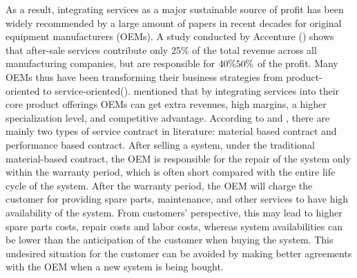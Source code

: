 \documentclass[preprint,12pt]{elsarticle}
\begin{document}

As a result, integrating services as a major sustainable source of profit has been widely recommended by a large amount of papers in recent decades for original equipment manufacturers (OEMs). A study conducted by Accenture (\citet{Dennis}) shows that after-sale services contribute only 25\% of the total revenue across all manufacturing companies, but are responsible for $40\%\-50\%$ of the profit. Many OEMs thus have been transforming their business strategies from product-oriented to service-oriented(\citet{Cohen2006}). \citet{Oliva} mentioned that by integrating services into their core product offerings OEMs can get extra revenues, high margins, a higher specialization level, and competitive advantage. According to \citet{Kim2007} and \citet{Oliva}, there are mainly two types of service contract in literature: material based contract and performance based contract. After selling a system, under the traditional material-based contract, the OEM is responsible for the repair of the system only within the warranty period, which is often short compared with the entire life cycle of the system. After the warranty period, the OEM will charge the customer for providing spare parts, maintenance, and other services to have high availability of the system. From customers' perspective, this may lead to higher spare parts costs, repair costs and labor costs, whereas system availabilities can be lower than the anticipation of the customer when buying the system. This undesired situation for the customer can be avoided by making better agreements with the OEM when a new system is being bought.
\end{document}
